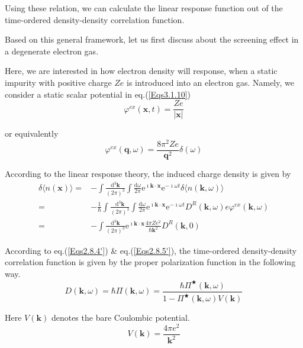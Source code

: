 Using these relation, we can calculate the linear response function out of the time-ordered density-density correlation function.

Based on this general framework, let us first discuss about the screening effect in a degenerate electron gas.

Here, we are interested in how electron density will response, when a static impurity with positive charge $Z e$ is introduced into an electron gas. Namely, we consider a static scalar potential in eq.(\ref{Eqs3.1.10})
\begin{equation} \label{Eqs3.1.19}
\varphi^{ex}(\mathbf{x},t) = \frac{Z e}{|\mathbf{x}|}
\end{equation}

or equivalently
\begin{equation*} \label{Eqs3.1.19'} \tag{3.1.19'}
\varphi^{ex}(\mathbf{q},\omega) = \frac{8\pi^2 Z e}{\mathbf{q}^2} \delta(\omega)
\end{equation*}

According to the linear response theory, the induced charge density is given by
\begin{equation} \label{Eqs3.1.20}\begin{split} \delta\langle n(\mathbf{x}) \rangle =& -\int \frac{\mathrm{d}^3 \mathbf{k}}{(2\pi)^3} \int \frac{\mathrm{d} \omega}{2\pi} \mathrm{e}^{\imath \mathbf{k} \cdot \mathbf{x}}\mathrm{e}^{-\imath \omega t} \delta\langle n(\mathbf{k},\omega) \rangle\\
=& -\frac{1}{\hbar} \int \frac{\mathrm{d}^3 \mathbf{k}}{(2\pi)^3}\int \frac{\mathrm{d}\omega}{2\pi} \mathrm{e}^{\imath \mathbf{k} \cdot \mathbf{x}}\mathrm{e}^{-\imath \omega t} D^R(\mathbf{k},\omega) e \varphi^{ex}(\mathbf{k},\omega)\\
=& - \int \frac{\mathrm{d}^3 \mathbf{k}}{(2\pi)^3} \mathrm{e}^{\imath \mathbf{k}\cdot \mathbf{x}}\frac{4\pi Z e^2}{\hbar \mathbf{k}^2} D^R(\mathbf{k},0) \end{split}\end{equation}

According to eq.(\ref{Eqs2.8.4'}) \& eq.(\ref{Eqs2.8.5'}), the time-ordered density-density correlation function is given by the proper polarization function in the following way.
\[ D(\mathbf{k},\omega) = \hbar \Pi(\mathbf{k},\omega) = \frac{\hbar \Pi^{\bigstar}(\mathbf{k},\omega)}{1-\Pi^{\bigstar}(\mathbf{k},\omega)V(\mathbf{k})} \]

Here $V(\mathbf{k})$ denotes the bare Coulombic potential.
\[ V(\mathbf{k}) = \frac{4\pi e^2}{\mathbf{k}^2} \]

